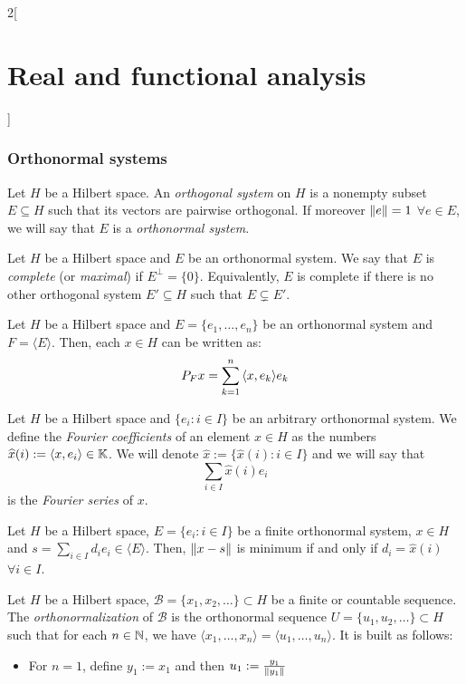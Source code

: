 \documentclass[../../../main_math.tex]{subfiles}
\begin{document}
\begin{multicols}{2}[\section{Real and functional analysis}]
  \subsubsection{Orthonormal systems}
  \begin{definition}
    Let $H$ be a Hilbert space. An \emph{orthogonal system} on $H$ is a nonempty subset $E\subseteq H$ such that its vectors are pairwise orthogonal. If moreover $\left\|e\right\|=1 $ $\forall e\in E$, we will say that $E$ is a \emph{orthonormal system}.
  \end{definition}
  \begin{definition}
    Let $H$ be a Hilbert space and $E$ be an orthonormal system. We say that $E$ is \emph{complete} (or \emph{maximal}) if $E^\perp =\{0\}$. Equivalently, $E$ is complete if there is no other orthogonal system $E'\subseteq H$ such that $E\subsetneq E'$.
  \end{definition}
  \begin{lemma}
    Let $H$ be a Hilbert space and $E=\{e_1,\ldots,e_n\}$ be an orthonormal system and $F=\langle E\rangle$. Then, each $x\in H$ can be written as: $$P_Fx=\sum_{k=1}^n{\left\langle x,e_k\right\rangle}e_k$$
  \end{lemma}
  \begin{definition}
    Let $H$ be a Hilbert space and $\{e_i:i\in I\}$ be an arbitrary orthonormal system. We define the \emph{Fourier coefficients} of an element $x\in H$ as the numbers $\widehat{x}(i):={\left\langle x,e_i\right\rangle}\in\mathbb{K}$. We will denote $\widehat{x}:=\{\widehat{x}(i):i\in I\}$ and we will say that $$\sum_{i\in I}\widehat{x}(i)e_i$$ is the \emph{Fourier series} of $x$.
  \end{definition}
  \begin{proposition}
    Let $H$ be a Hilbert space, $E=\{e_i:i\in I\}$ be a finite orthonormal system, $x\in H$ and $s=\sum_{i\in I}d_ie_i\in\langle E\rangle$. Then, $\left\|x-s\right\|$ is minimum if and only if $d_i=\widehat{x}(i)$ $\forall i\in I$.
  \end{proposition}
  \begin{proposition}
    Let $H$ be a Hilbert space, $\mathcal{B}=\{x_1,x_2,\ldots\}\subset H$ be a finite or countable sequence. The \emph{orthonormalization} of $\mathcal{B}$ is the orthonormal sequence $U=\{u_1,u_2,\ldots\}\subset H$ such that for each $n\in \mathbb{N}$, we have $\langle x_1,\dots,x_n\rangle = \langle u_1,\dots,u_n\rangle$. It is built as follows:
    \begin{itemize}
      \item For $n = 1$, define $y_1:=x_1$ and then $u_1:=\frac{y_1}{\left\|y_1\right\|}$

\end{itemize}
\end{proposition}
\end{multicols}
\end{document}
